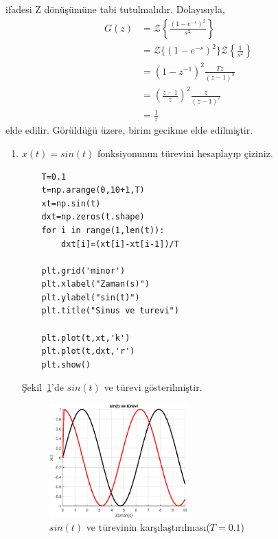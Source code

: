 ifadesi Z dönüşümüne tabi tutulmalıdır. Dolayısıyla,
\begin{equation}
    \begin{split}
        G(z)&=\mathcal{Z}\left\{\frac{(1-e^{-s})^2}{s^2}\right\}\\
        &=\mathcal{Z}\{(1-e^{-s})^2\}\mathcal{Z}\left\{\frac{1}{s^2}\right\}\\
        &=\left(1-z^{-1}\right)^2\frac{Tz}{(z-1)^2}\\
        &=\left(\frac{z-1}{z}\right)^2\frac{z}{(z-1)^2}\\
        &=\frac{1}{z}
    \end{split}\label{eqn:ornek_sistem_foh}
\end{equation}
elde edilir. Görüldüğü üzere, birim gecikme elde edilmiştir.

\begin{enumerate}
    \item $x(t)=sin(t)$ fonksiyonunun türevini hesaplayıp çiziniz.
    \begin{lstlisting}
    T=0.1
    t=np.arange(0,10+1,T)
    xt=np.sin(t)
    dxt=np.zeros(t.shape)
    for i in range(1,len(t)):
        dxt[i]=(xt[i]-xt[i-1])/T
    
    plt.grid('minor')
    plt.xlabel("Zaman(s)")
    plt.ylabel("sin(t)")
    plt.title("Sinus ve turevi")

    plt.plot(t,xt,'k')
    plt.plot(t,dxt,'r')
    plt.show()
    \end{lstlisting}
    Şekil~\ref{fig:lec2_plot1}'de $sin(t)$ ve türevi gösterilmiştir.
    \begin{figure}[!htb]
        \centering
        \includegraphics[width=0.5\textwidth]{img/lec2_plot1}
        \caption{$sin(t)$ ve türevinin karşılaştırılması($T=0.1$)}
        \label{fig:lec2_plot1}
    \end{figure}


\end{enumerate}

